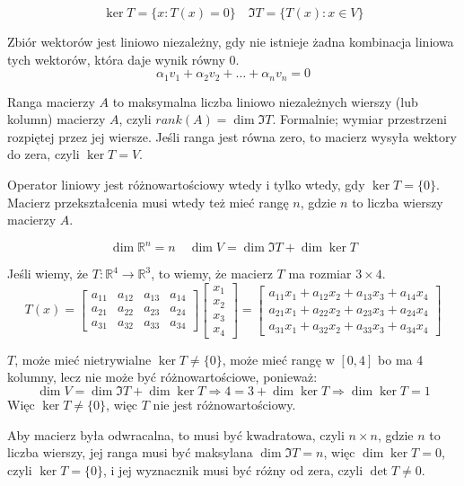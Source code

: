 \documentclass{../notatki}
\begin{document}
$$
\ker T = \{x : T(x) = 0\} \quad \Im T = \{T(x) : x \in V\}
$$

Zbiór wektorów jest liniowo niezależny, gdy nie istnieje żadna
kombinacja liniowa tych wektorów, która daje wynik równy 0.
$$
\alpha_1 v_1 + \alpha_2 v_2 + \dots + \alpha_n v_n = 0
$$

Ranga macierzy $A$ to maksymalna liczba liniowo niezależnych wierszy
(lub kolumn) macierzy $A$, czyli $rank(A) = \dim \Im T$. Formalnie;
wymiar przestrzeni rozpiętej przez jej wiersze. Jeśli ranga jest
równa zero, to macierz wysyła wektory do zera, czyli $\ker T = V$.

Operator liniowy jest różnowartościowy wtedy i tylko wtedy, gdy $\ker
T = \{0\}$. Macierz przekształcenia musi wtedy też mieć rangę $n$, gdzie $n$ to
liczba wierszy macierzy $A$.

$$
\dim \mathbb{R}^n = n \quad \dim V = \dim \Im T + \dim \ker T
$$

\begin{examplebox}
  Jeśli wiemy, że $T: \mathbb{R}^4 \to \mathbb{R}^3$, to wiemy, że macierz
  $T$ ma rozmiar $3 \times 4$.
  $$
  T(x) =
  \begin{bmatrix}
    a_{11} & a_{12} & a_{13} & a_{14} \\
    a_{21} & a_{22} & a_{23} & a_{24} \\
    a_{31} & a_{32} & a_{33} & a_{34}
  \end{bmatrix}
  \begin{bmatrix}
    x_1 \\
    x_2 \\
    x_3 \\
    x_4
  \end{bmatrix}
  =
  \begin{bmatrix}
    a_{11}x_1 + a_{12}x_2 + a_{13}x_3 + a_{14}x_4 \\
    a_{21}x_1 + a_{22}x_2 + a_{23}x_3 + a_{24}x_4 \\
    a_{31}x_1 + a_{32}x_2 + a_{33}x_3 + a_{34}x_4
  \end{bmatrix}
  $$

  $T$, może mieć nietrywialne $\ker T \neq \{0\}$, może mieć rangę w
  $[0, 4]$ bo ma 4 kolumny, lecz nie może być różnowartościowe, ponieważ:
  $$
  \dim V = \dim \Im T + \dim \ker T \Rightarrow 4 = 3 + \dim \ker T
  \Rightarrow \dim \ker T = 1
  $$
  Więc $\ker T \neq \{0\}$, więc $T$ nie jest różnowartościowy.
\end{examplebox}

Aby macierz była odwracalna, to musi być kwadratowa, czyli $n \times
n$, gdzie $n$ to liczba wierszy, jej ranga musi być maksylana $\dim \Im T = n$,
więc $\dim \ker T = 0$, czyli $\ker T = \{0\}$, i jej wyznacznik musi
być różny od zera, czyli $\det T \neq 0$.
\end{document}
